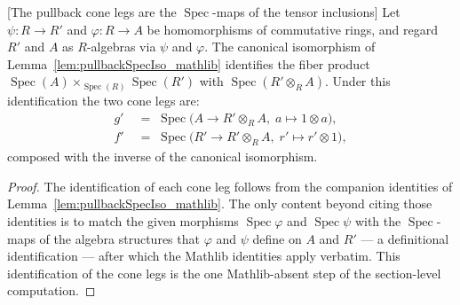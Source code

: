 \begin{lemma}



[The pullback cone legs are the \(\operatorname{Spec}\)-maps of the tensor inclusions]
  \label{lem:pullback_fst_snd_specMap_tensor}
  Let \(\psi : R \to R'\) and \(\varphi : R \to A\) be homomorphisms of commutative
  rings, and regard \(R'\) and \(A\) as \(R\)-algebras via \(\psi\) and \(\varphi\).
  The canonical isomorphism of Lemma~\ref{lem:pullbackSpecIso_mathlib} identifies the
  fiber product \(\operatorname{Spec}(A) \times_{\operatorname{Spec}(R)}
  \operatorname{Spec}(R')\) with \(\operatorname{Spec}(R' \otimes_R A)\). Under this
  identification the two cone legs are:
  \begin{align*}
    g' &\;=\; \operatorname{Spec}\bigl(A \to R' \otimes_R A,\; a \mapsto 1 \otimes a\bigr),\\
    f' &\;=\; \operatorname{Spec}\bigl(R' \to R' \otimes_R A,\; r' \mapsto r' \otimes 1\bigr),
  \end{align*}
  composed with the inverse of the canonical isomorphism.
\end{lemma}

\begin{proof}
  The identification of each cone leg follows from the companion identities of
  Lemma~\ref{lem:pullbackSpecIso_mathlib}. The only content beyond citing those
  identities is to match the given morphisms \(\operatorname{Spec}\varphi\) and
  \(\operatorname{Spec}\psi\) with the \(\operatorname{Spec}\)-maps of the algebra
  structures that \(\varphi\) and \(\psi\) define on \(A\) and \(R'\) — a definitional
  identification — after which the Mathlib identities apply verbatim. This identification
  of the cone legs is the one Mathlib-absent step of the section-level computation.
\end{proof}

